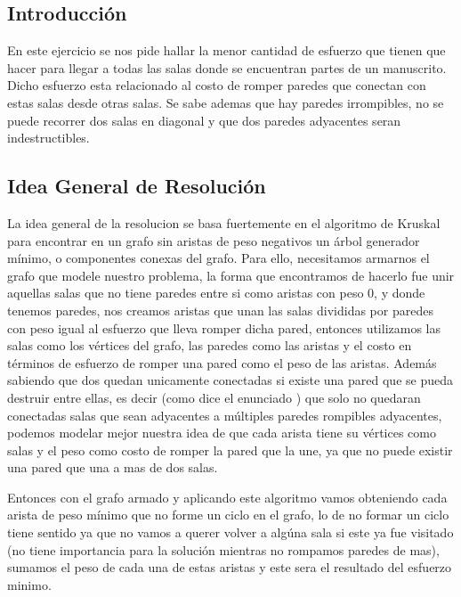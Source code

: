 \subsection{Introducci\'on}

En este ejercicio se nos pide hallar la menor cantidad de esfuerzo que tienen que hacer para llegar a todas las salas donde se encuentran partes de un manuscrito.
Dicho esfuerzo esta relacionado al costo de romper paredes que conectan con estas salas desde otras salas. Se sabe ademas que hay paredes irrompibles, no se puede recorrer dos salas en diagonal y que dos paredes adyacentes seran indestructibles.

\subsection{Idea General de Resoluci\'on}

La idea general de la resolucion se basa fuertemente en el algoritmo de Kruskal para encontrar en un grafo sin aristas de peso negativos un árbol generador mínimo, o componentes conexas del grafo. Para ello, necesitamos armarnos el grafo que modele nuestro problema, la forma que encontramos de hacerlo fue unir aquellas salas que no tiene paredes entre si
como aristas con peso 0, y donde tenemos paredes, nos creamos aristas que unan las salas divididas por paredes con peso igual al esfuerzo que lleva romper dicha pared, entonces  utilizamos las salas como los vértices del grafo, las paredes como las aristas y el costo en términos de esfuerzo de romper una pared
como el peso de las aristas. Además sabiendo que dos quedan unicamente conectadas si existe una pared que se pueda destruir entre ellas, es decir (como dice el enunciado ) que solo no quedaran conectadas salas que sean adyacentes a múltiples paredes rompibles adyacentes, podemos modelar mejor nuestra idea de que cada arista tiene su vértices como salas y el peso como costo de romper la pared que la une, ya que no puede existir una pared que una a mas de dos salas.

Entonces con el grafo armado y aplicando este algoritmo vamos obteniendo cada arista de peso mínimo que no forme un ciclo en el grafo, lo de no formar un ciclo tiene sentido 
ya que no vamos a querer volver a algúna sala si este ya fue visitado (no tiene importancia para la solución mientras no rompamos paredes de mas), sumamos el peso de cada una de estas aristas y este sera el resultado del esfuerzo minimo. 

